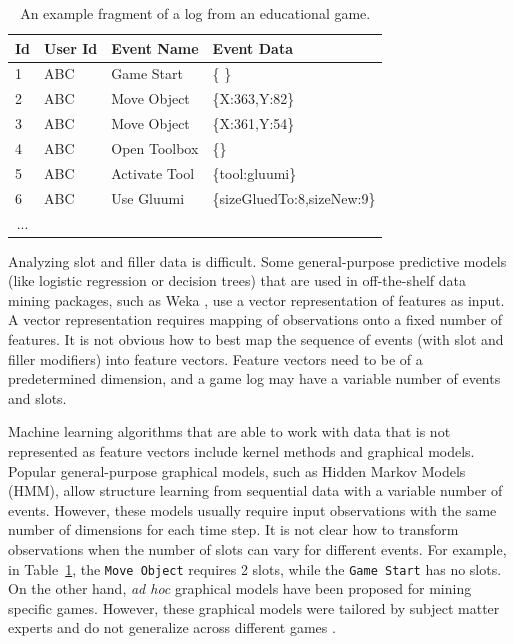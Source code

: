\documentclass{sigchi}
\begin{document}
	\begin{table}[tbh]
		\begin{tabular}{@{}llll@{}}
			\toprule
			\textbf{Id}             & \textbf{User Id} & \textbf{Event Name} & \textbf{Event Data}        \\ \midrule
			1                       & ABC              & Game Start          & \{ \}                        \\
			2                       & ABC              & Move Object         & \{X:363,Y:82\} \\
			3                       & ABC              & Move Object         & \{X:361,Y:54\} \\
			4                       & ABC              & Open Toolbox        & \{\}        \\
			5                       & ABC              & Activate Tool        & \{tool:gluumi\}        \\
			6                       & ABC              & Use Gluumi        & \{sizeGluedTo:8,sizeNew:9\} \\        
			\multicolumn{1}{c}{...} &                  &                     &                            \\ \bottomrule
		\end{tabular}
		\caption{An example fragment of a log from an educational game. \label{tbl:log_example}}
	\end{table}
	
	Analyzing slot and filler data is difficult.
	Some general-purpose predictive models (like logistic regression or decision trees)  that are used in off-the-shelf data mining packages, such as Weka \cite{hall2009weka}, use a vector representation of features as input. 
	A vector representation requires mapping of observations onto a fixed number of features.
	It is not obvious how to best map the sequence of events (with slot and filler modifiers)  into feature vectors.
	Feature vectors need to be of a predetermined dimension, and a game log may have a variable number of events and slots.
	
	Machine learning algorithms that are able to work with data that is not represented as feature vectors include kernel methods and graphical models.
	Popular general-purpose graphical models, such as Hidden Markov Models (HMM), allow structure learning from sequential data with a variable number of events.
	However, these models usually require input observations with the same number of dimensions for each time step.
	It is not clear how to transform observations when the number of slots can vary for different events.
	For example, in Table~\ref{tbl:log_example}, the \texttt{Move Object} requires 2 slots, while the \texttt{Game Start} has no slots.
	On the other hand, \textit{ad hoc} graphical models have  been proposed for mining specific games.
	However, these graphical models were tailored by subject matter experts and do not generalize across different games \cite{rowe2010integrating}.
	
\end{document}
